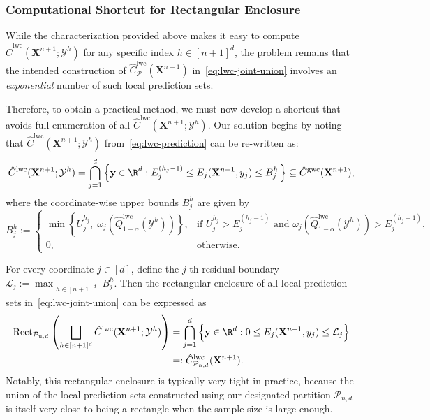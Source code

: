 \subsubsection{Computational Shortcut for Rectangular Enclosure}

{\color{blue}
While the characterization provided above makes it easy to compute $\hat{C}^{\mathrm{lwc}}(\mathbf{X}^{n+1};\mathcal{Y}^h)$ for any specific index $h \in [n+1]^d$, the problem remains that the intended construction of $\hat{C}^{\mathrm{lwc}}_{\mathcal{P}}(\mathbf{X}^{n+1})$ in~\eqref{eq:lwc-joint-union} involves an {\em exponential} number of such local prediction sets. 

Therefore, to obtain a practical method, we must now develop a shortcut that avoids full enumeration of all $\hat{C}^{\mathrm{lwc}}(\mathbf{X}^{n+1};\mathcal{Y}^h)$.
Our solution begins by noting that $\hat{C}^{\mathrm{lwc}}(\mathbf{X}^{n+1};\mathcal{Y}^h)$ from~\eqref{eq:lwc-prediction} can be re-written as:
\[
\hat{C}^\mathrm{lwc}(\mathbf{X}^{n+1}; \mathcal{Y}^h) = \bigcap_{j=1}^d \left\{ \mathbf y\in\R^d : E^{(h_j-1)}_j \leq E_j(\mathbf{X}^{n+1},y_j) \leq B^h_j \,\right\} \subseteq \hat{C}^\mathrm{gwc}(\mathbf{X}^{n+1}), 
\]
where the coordinate-wise upper bounds $B^h_j$ are given by
\begin{equation} \label{eq:rect-wise-bounds}
B^h_j := 
\begin{cases}
\min\left\{U^{h_j}_j,\; \omega_j(\hat{Q}^{\mathrm{lwc}}_{1-\alpha}(\mathcal{Y}^h))\right\},
& \text{if } U^{h_j}_j > E^{(h_j-1)}_j \text{ and } \omega_j(\hat{Q}^{\mathrm{lwc}}_{1-\alpha}(\mathcal{Y}^h)) > E^{(h_j-1)}_j,\\[0.4em]
0, & \text{otherwise.}
\end{cases}
\end{equation}

For every coordinate $j \in [d]$, define the $j$-th residual boundary $\mathcal{L}_j := \max_{\substack{h \in [n+1]^d}}B^h_j$. 
Then the rectangular enclosure of all local prediction sets in~\eqref{eq:lwc-joint-union} can be expressed as
\begin{equation}
\begin{aligned}
    \mathrm{Rect}_{\mathcal{P}_{n,d}}\left(\bigsqcup_{h \in [n+1]^d} \hat{C}^\mathrm{lwc}(\mathbf{X}^{n+1};\mathcal{Y}^h)\right) &= \bigcap_{j=1}^d \left\{ \mathbf y\in\R^d : 0 \leq E_j(\mathbf{X}^{n+1},y_j) \leq \mathcal{L}_j \right\}\\
&=: \hat{C}^\mathrm{lwc}_{\mathcal{P}_{n,d}}(\mathbf{X}^{n+1}).
\end{aligned}
\end{equation}
Notably, this rectangular enclosure is typically very tight in practice, because the union of the local prediction sets constructed using our designated partition $\mathcal{P}_{n,d}$ is itself very close to being a rectangle when the sample size is large enough.}

